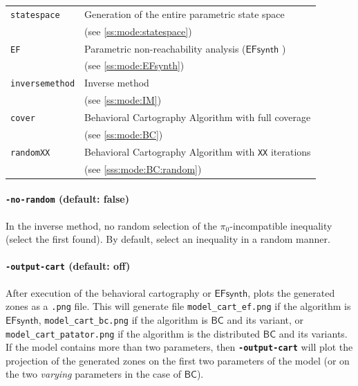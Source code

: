 \documentclass[a4paper,11pt]{report}
\newcommand{\pio}{\pi_0}
\newcommand{\BC}{\ensuremath{\mathsf{BC}}}
\newcommand{\EFsynth}{\ensuremath{\mathsf{EFsynth}}}
\newcommand{\code}[1]{\textbf{\texttt{#1}}}
\newcommand{\styleOption}[1]{\textcolor{optioncolor}{\texttt{#1}}}
\newcommand{\stylePath}[1]{\textcolor{pathcolor}{\texttt{#1}}}
\begin{document}
\begin{tabular}{@{} l @{\ \ } l}
	\styleOption{statespace} & Generation of the entire parametric state space \\
	& (see \cref{ss:mode:statespace}) \\
	
	\styleOption{EF} & Parametric non-reachability analysis (\EFsynth{} \cite{JLR15}) \\
	& (see \cref{ss:mode:EFsynth}) \\
	
	\styleOption{inversemethod} & Inverse method \\
	& (see \cref{ss:mode:IM}) \\
	
	\styleOption{cover} & Behavioral Cartography Algorithm with full coverage \\
	& (see \cref{ss:mode:BC}) \\
	
	\styleOption{randomXX} & Behavioral Cartography Algorithm with \styleOption{XX} iterations \\
	& (see \cref{sss:mode:BC:random}) \\
\end{tabular}



\paragraph{\styleOption{-no-random} (default: false)}
In the inverse method, no random selection of the $\pio$-incompatible inequality (select the first found).
By default, select an inequality in a random manner.



\paragraph{\styleOption{-output-cart} (default: off)}

After execution of the behavioral cartography or \EFsynth{}, plots the generated zones as a \texttt{.png} file.
This will generate file \stylePath{model\_cart\_ef.png} if the algorithm is \EFsynth{},
\stylePath{model\_cart\_bc.png} if the algorithm is \BC{} and its variant,
or \stylePath{model\_cart\_patator.png} if the algorithm is the distributed \BC{} and its variants.
If the model contains more than two parameters, then \code{-output-cart} will plot the projection of the generated zones on the first two parameters of the model (or on the two \emph{varying} parameters in the case of \BC{}).
\end{document}
